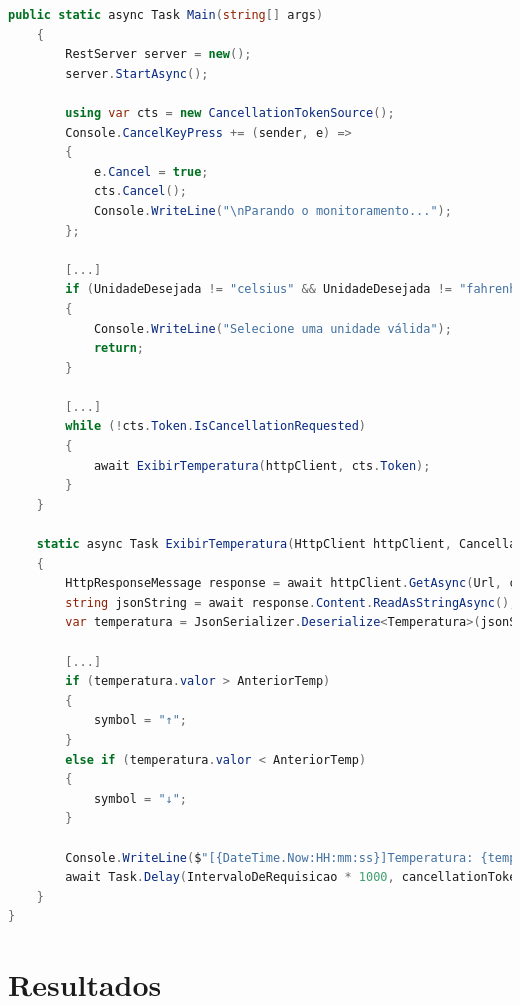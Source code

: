 \documentclass[
	12pt,				%
	oneside,			%
	a4paper,			%
	english,			%
	brazil,				%
	]{abntex2}
\begin{document}
{\begin{lstlisting}[language=csharp]
    public static async Task Main(string[] args)
    {
        RestServer server = new();
        server.StartAsync();
        
        using var cts = new CancellationTokenSource();
        Console.CancelKeyPress += (sender, e) =>
        {
            e.Cancel = true;
            cts.Cancel();
            Console.WriteLine("\nParando o monitoramento...");
        };
        
        [...]
        if (UnidadeDesejada != "celsius" && UnidadeDesejada != "fahrenheit" && UnidadeDesejada != "kelvin")
        {
            Console.WriteLine("Selecione uma unidade válida");
            return;
        }
        
        [...]
        while (!cts.Token.IsCancellationRequested)
        {
            await ExibirTemperatura(httpClient, cts.Token);
        }
    }
    
    static async Task ExibirTemperatura(HttpClient httpClient, CancellationToken cancellationToken)
    {
        HttpResponseMessage response = await httpClient.GetAsync(Url, cancellationToken);
        string jsonString = await response.Content.ReadAsStringAsync();
        var temperatura = JsonSerializer.Deserialize<Temperatura>(jsonString);
        
        [...]
        if (temperatura.valor > AnteriorTemp)
        {
            symbol = "↑";
        }
        else if (temperatura.valor < AnteriorTemp)
        {
            symbol = "↓";
        }
        
        Console.WriteLine($"[{DateTime.Now:HH:mm:ss}]Temperatura: {temperatura.valor}°{temperatura.unidade} {symbol}");
        await Task.Delay(IntervaloDeRequisicao * 1000, cancellationToken);
    }
}
\end{lstlisting}

\section{Resultados}

}
\end{document}

